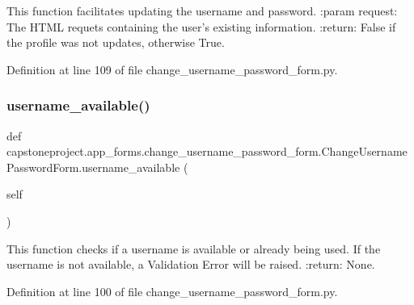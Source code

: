 \begin{DoxyVerb}This function facilitates updating the username and password.
:param request: The HTML requets containing the user's existing information.
:return: False if the profile was not updates, otherwise True.
\end{DoxyVerb}
 

Definition at line 109 of file change\+\_\+username\+\_\+password\+\_\+form.\+py.

\mbox{\label{classcapstoneproject_1_1app__forms_1_1change__username__password__form_1_1_change_username_password_form_a06a27de23dc0cbf0659e09888df35d90}} 
\subsubsection{\texorpdfstring{username\+\_\+available()}{username\_available()}}
{\footnotesize\ttfamily def capstoneproject.\+app\+\_\+forms.\+change\+\_\+username\+\_\+password\+\_\+form.\+Change\+Username\+Password\+Form.\+username\+\_\+available (\begin{DoxyParamCaption}\item[{}]{self }\end{DoxyParamCaption})}

\begin{DoxyVerb}This function checks if a username is available or already being used. If the username is not available, a
Validation Error will be raised.
:return: None.
\end{DoxyVerb}
 

Definition at line 100 of file change\+\_\+username\+\_\+password\+\_\+form.\+py.



